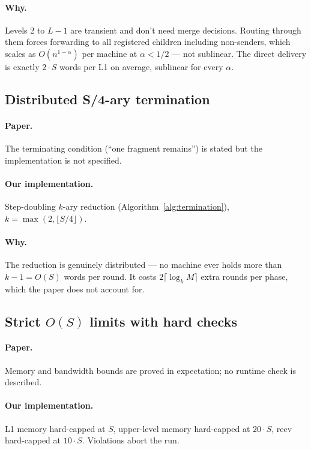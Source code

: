 \documentclass[11pt]{article}
\begin{document}
\paragraph{Why.} Levels 2 to $L - 1$ are transient and don't need merge
decisions. Routing through them forces forwarding to all registered
children including non-senders, which scales as $O(n^{1-\alpha})$ per
machine at $\alpha < 1/2$ --- not sublinear. The direct delivery is exactly
$2 \cdot S$ words per L1 on average, sublinear for every $\alpha$.

\subsection{Distributed S/4-ary termination}

\paragraph{Paper.} The terminating condition (``one fragment remains'') is
stated but the implementation is not specified.

\paragraph{Our implementation.} Step-doubling $k$-ary reduction
(Algorithm~\ref{alg:termination}), $k = \max(2, \lfloor S/4 \rfloor)$.

\paragraph{Why.} The reduction is genuinely distributed --- no machine ever
holds more than $k - 1 = O(S)$ words per round. It costs
$2 \lceil \log_k M \rceil$ extra rounds per phase, which the paper does
not account for.

\subsection{Strict \texorpdfstring{$O(S)$}{O(S)} limits with hard checks}

\paragraph{Paper.} Memory and bandwidth bounds are proved in expectation;
no runtime check is described.

\paragraph{Our implementation.} L1 memory hard-capped at $S$, upper-level
memory hard-capped at $20 \cdot S$, recv hard-capped at $10 \cdot S$.
Violations abort the run.
\end{document}
